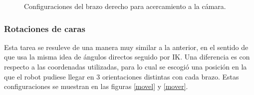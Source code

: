 \begin{figure}[h!]
	\centering
	\hfill
	\hfill
	\caption{Configuraciones del brazo derecho para acercamiento a la cámara.}
	\label{camr}
\end{figure}

\subsubsection{Rotaciones de caras}
Esta tarea se resuleve de una manera muy similar a la anterior, en el sentido de que usa la misma idea de ángulos directos seguido por IK. Una diferencia es con respecto a las coordenadas utilizadas, para lo cual se escogió una posición en la que el robot pudiese llegar en 3 orientaciones distintas con cada brazo. Estas configuraciones se muestran en las figuras \ref{movel} y \ref{mover}.

